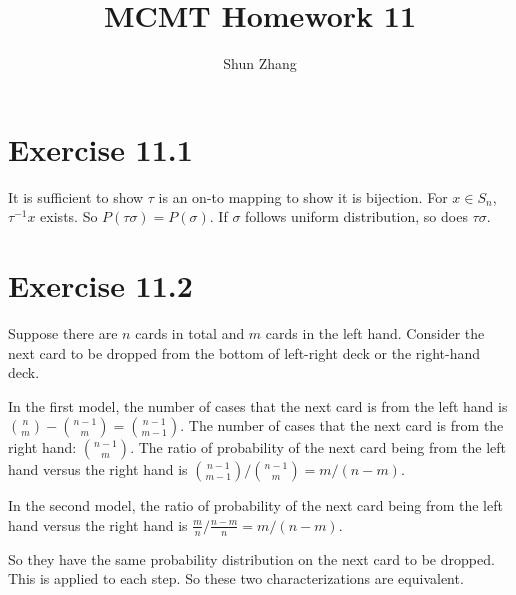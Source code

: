 \documentclass[10pt]{article}
\title{MCMT Homework 11}
\author{Shun Zhang}
\date{}
\begin{document}
\maketitle

\section*{Exercise 11.1}

It is sufficient to show $\tau$ is an on-to mapping to show it is bijection. For
$x \in S_n$, $\tau^{-1} x$ exists. So $P(\tau \sigma) = P(\sigma)$. If
$\sigma$ follows uniform distribution, so does $\tau \sigma$.

\section*{Exercise 11.2}

Suppose there are $n$ cards in total and $m$ cards in the left hand. Consider
the next card to be dropped from the bottom of left-right deck or the right-hand
deck.

In the first model, the number of cases that the next card is from the left hand
is ${n \choose m} - {n-1 \choose m} = {n-1 \choose m-1}$.  The number of cases
that the next card is from the right hand: ${n-1 \choose m}$.
The ratio of probability of the next card being from the left hand versus the
right hand is ${n-1 \choose m-1} / {n-1 \choose m} = m / (n - m)$.

In the second model, the ratio of probability of the next card being from the
left hand versus the right hand is $\frac{m}{n} / \frac{n-m}{n} = m / (n - m)$.

So they have the same probability distribution on the next card to be dropped.
This is applied to each step. So these two characterizations are equivalent.
\end{document}
